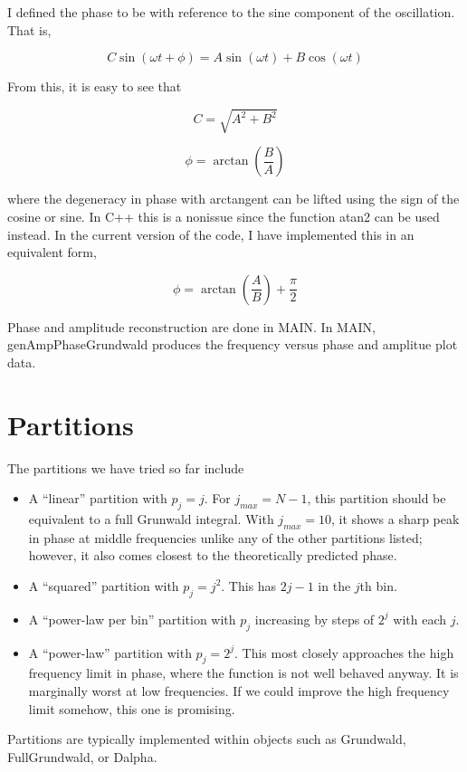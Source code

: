 \documentclass[12]{article}
\begin{document}
I defined the phase to be with reference to the sine component of the
oscillation. That is, 

\begin{equation}
C\sin(\omega t +\phi) = A\sin(\omega t) +
B\cos(\omega t)
\label{phaseDef}
\end{equation}

\noindent From this, it is easy to see that

\begin{equation}
C = \sqrt{A^2+B^2}
\label{amplitude}
\end{equation}

\begin{equation}
\phi = \arctan\left(\frac{B}{A}\right)
\label{phase}
\end{equation}

\noindent where the degeneracy in phase with arctangent can be lifted
using the sign of the cosine or sine. In C++ this is a nonissue since
the function atan2 can be used instead. In the current version of the
code, I have implemented this in an equivalent form,

\begin{equation}
\phi = \arctan\left(\frac{A}{B}\right)+\frac{\pi}{2}
\label{equivPhase}
\end{equation}

\noindent Phase and amplitude reconstruction are done in MAIN. In
MAIN, genAmpPhaseGrundwald produces the frequency versus phase and
amplitue plot data.

\section{Partitions}

The partitions we have tried so far include 

\begin{itemize}

\item A ``linear'' partition with $p_j=j$. For $j_{max} = N-1$, this
  partition should be equivalent to a full Grunwald integral. With
  $j_{max}=10$, it shows a sharp peak in phase at middle frequencies
  unlike any of the other partitions listed; however, it also comes
  closest to the theoretically predicted phase.

\item A ``squared'' partition with $p_j=j^2$. This has $2j-1$ in the
  $j$th bin. 

\item A ``power-law per bin'' partition with $p_j$ increasing by steps
  of $2^j$ with each $j$. 

\item A ``power-law'' partition with $p_j = 2^j$. This most closely
  approaches the high frequency limit in phase, where the function is
  not well behaved anyway. It is marginally worst at low
  frequencies. If we could improve the high frequency limit somehow,
  this one is promising.
\end{itemize}

Partitions are typically implemented within objects such as Grundwald,
FullGrundwald, or Dalpha. 
\end{document}
